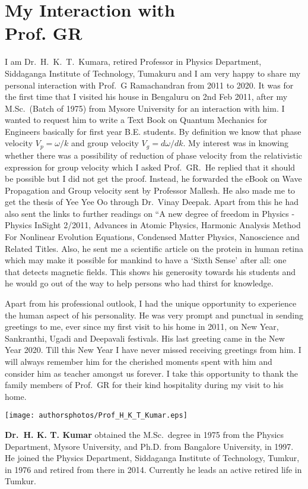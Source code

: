 \chapter[My Interaction with Prof. GR]{My Interaction with\\ Prof. GR}


I am Dr.\ H.\ K.\ T.\ Kumara, retired Professor in Physics Department, Siddaganga Institute of Technology, Tumakuru and I am very happy to share my personal interaction with Prof.\ G Ramachandran from 2011 to 2020. It was for the first time that I visited his house in Bengaluru on 2nd Feb 2011, after my M.Sc.\ (Batch of 1975) from Mysore University for an interaction with him. I wanted to request him to write a Text Book on Quantum Mechanics for Engineers basically for first year B.E. students. By definition we know that phase velocity $V_p=\omega/k$ and group velocity $V_g=d\omega/dk$.  My interest was in knowing whether there was a possibility of reduction of phase velocity from the relativistic expression for group velocity which I asked Prof.\ GR.\  He replied that it should be possible but I did not get the proof. Instead, he forwarded the eBook on Wave Propagation and Group velocity sent by Professor Mallesh.  He also made me to get the thesis of Yee Yee Oo through Dr.\ Vinay Deepak. Apart from this he had also sent the links to further readings on “A new degree of freedom in Physics - Physics InSight 2/2011, Advances in Atomic Physics, Harmonic Analysis Method For Nonlinear Evolution Equations, Condensed Matter Physics, Nanoscience and Related Titles.  Also, he sent me a scientific article on the protein in human retina which may make it possible for mankind to have a ‘Sixth Sense’ after all: one that detects magnetic fields. This shows his generosity towards his students and he would go out of the way to help persons who had thirst for knowledge. 

Apart from his professional outlook, I had the unique opportunity to experience the human aspect of his personality.  He was very prompt and punctual in sending greetings to me, ever since my first visit to his home in 2011, on New Year, Sankranthi, Ugadi and Deepavali festivals.  His last greeting came in the New Year 2020.  Till this New Year I have never missed receiving greetings from him. I will always remember him for the cherished  moments spent with him and consider him as teacher amongst us forever. I take this opportunity to thank the family members of Prof.\ GR for their kind hospitality during my visit to his home.
\vskip 0.5cm

\centerline{\texttt{[image: authorsphotos/Prof\_H\_K\_T\_Kumar.eps]}}
\bigskip

\noindent
\textbf{Dr.\ H. K. T. Kumar} obtained the M.Sc.\ degree in 1975 from the Physics Department, Mysore University, and  Ph.D. from Bangalore University, in 1997. He joined the Physics Department, Siddaganga Institute of Technology, Tumkur, in 1976 and retired from there in 2014. Currently he leads an active retired life in Tumkur.
